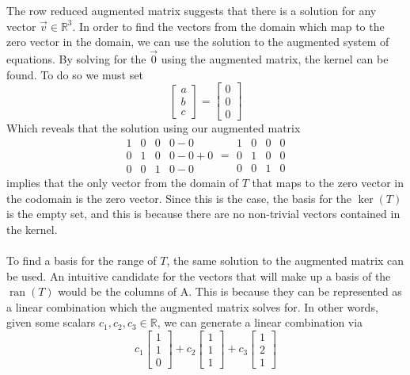\documentclass{report}
\begin{document}
The row reduced augmented matrix suggests that there is a solution for any vector $\vec{v}\in\mathbb{R}^3$.  In order to find the vectors from the domain which map to the zero vector in the domain,  we can use the solution to the augmented system of equations.  By solving for the $\vec{0}$ using the augmented matrix,  the kernel can be found.  To do so we must set
$$
\begin{bmatrix} a \\ b \\ c \end{bmatrix} = \begin{bmatrix} 0 \\ 0 \\ 0 \end{bmatrix}
$$
Which reveals that the solution using our augmented matrix
$$
\begin{array}{ccc|c}
	1 & 0 & 0 & 0 - 0 \\
	0 & 1 & 0 & 0 - 0 + 0 \\
	0 & 0 & 1 & 0 - 0
\end{array} =
\begin{array}{ccc|c}
	1 & 0 & 0 & 0 \\
	0 & 1 & 0 & 0\\
	0 & 0 & 1 & 0
\end{array}
$$
implies that the only vector from the domain of $T$ that maps to the zero vector in the codomain is the zero vector.  Since this is the case,  the basis for the $\operatorname{ker}(T)$ is the empty set,  and this is because there are no non-trivial vectors contained in the kernel.  \\
\\
\noindent To find a basis for the range of $T$,  the same solution to the augmented matrix can be used.  An intuitive candidate for the vectors that will make up a basis of the $\operatorname{ran}(T)$ would be the columns of A.  This is because they can be represented as a linear combination which the augmented matrix solves for.  In other words,  given some scalars $c_1,c_2,c_3\in\mathbb{R}$,  we can generate a linear combination via
$$
c_1\begin{bmatrix} 1 \\ 1 \\ 0 \end{bmatrix} + 
c_2\begin{bmatrix} 1 \\ 1 \\ 1 \end{bmatrix} + 
c_3\begin{bmatrix} 1 \\ 2 \\ 1 \end{bmatrix}
$$
\end{document}
